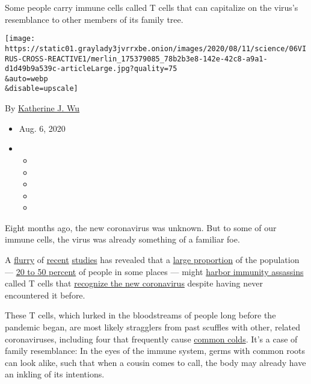 Some people carry immune cells called T cells that can capitalize on the
virus's resemblance to other members of its family tree.

\texttt{[image: https://static01.graylady3jvrrxbe.onion/images/2020/08/11/science/06VIRUS-CROSS-REACTIVE1/merlin\_175379085\_78b2b3e8-142e-42c8-a9a1-d1d49b9a539c-articleLarge.jpg?quality=75\\\&auto=webp\\\&disable=upscale]}

By
\href{https://www.nytimes3xbfgragh.onion/by/katherine-j--wu}{Katherine
J. Wu}

\begin{itemize}
\item
  Aug. 6, 2020
\item
  \begin{itemize}
  \item
  \item
  \item
  \item
  \item
  \end{itemize}
\end{itemize}

Eight months ago, the new coronavirus was unknown. But to some of our
immune cells, the virus was already something of a familiar foe.

A \href{https://immunology.sciencemag.org/content/5/48/eabd2071}{flurry}
of
\href{https://www.cell.com/cell/pdf/S0092-8674(20)30610-3.pdf}{recent}
\href{https://www.nature.com/articles/s41586-020-2550-z}{studies} has
revealed that a
\href{https://www.nature.com/articles/s41586-020-2598-9}{large
proportion} of the population ---
\href{https://www.nature.com/articles/s41577-020-0389-z.pdf}{20 to 50
percent} of people in some places --- might
\href{https://www.biorxiv.org/content/10.1101/2020.06.12.148916v1}{harbor
immunity assassins} called T cells that
\href{https://science.sciencemag.org/content/early/2020/08/04/science.abd3871}{recognize
the new coronavirus} despite having never encountered it before.

These T cells, which lurked in the bloodstreams of people long before
the pandemic began, are most likely stragglers from past scuffles with
other, related coronaviruses, including four that frequently cause
\href{https://www.ncbi.nlm.nih.gov/pmc/articles/PMC3416289/}{common
colds}. It's a case of family resemblance: In the eyes of the immune
system, germs with common roots can look alike, such that when a cousin
comes to call, the body may already have an inkling of its intentions.


